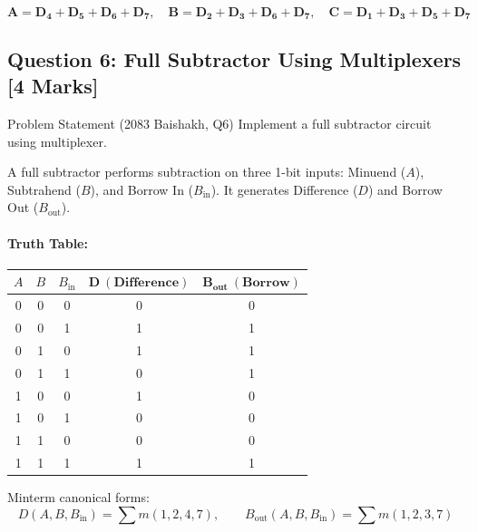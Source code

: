 \documentclass[11pt,a4paper,oneside]{book}
\begin{document}
\begin{answerbox}
$$\mathbf{A = D_4 + D_5 + D_6 + D_7, \quad B = D_2 + D_3 + D_6 + D_7, \quad C = D_1 + D_3 + D_5 + D_7}$$
\end{answerbox}

\vspace{0.6cm}

\subsection{Question 6: Full Subtractor Using Multiplexers [4 Marks]}
\begin{questionbox}{Problem Statement (2083 Baishakh, Q6)}
Implement a full subtractor circuit using multiplexer.
\end{questionbox}

A full subtractor performs subtraction on three 1-bit inputs: Minuend ($A$), Subtrahend ($B$), and Borrow In ($B_{\text{in}}$). It generates Difference ($D$) and Borrow Out ($B_{\text{out}}$).

\paragraph{Truth Table:}
\begin{center}
\begin{tabular}{|ccc||cc|}
\hline
$A$ & $B$ & $B_{\text{in}}$ & $\mathbf{D\ (Difference)}$ & $\mathbf{B_{\text{out}}\ (Borrow)}$ \\ \hline
0 & 0 & 0 & 0 & 0 \\ \hline
0 & 0 & 1 & 1 & 1 \\ \hline
0 & 1 & 0 & 1 & 1 \\ \hline
0 & 1 & 1 & 0 & 1 \\ \hline
1 & 0 & 0 & 1 & 0 \\ \hline
1 & 0 & 1 & 0 & 0 \\ \hline
1 & 1 & 0 & 0 & 0 \\ \hline
1 & 1 & 1 & 1 & 1 \\ \hline
\end{tabular}
\end{center}
Minterm canonical forms:
\[
D(A,B,B_{\text{in}}) = \sum m(1, 2, 4, 7), \qquad B_{\text{out}}(A,B,B_{\text{in}}) = \sum m(1, 2, 3, 7)
\]
\end{document}
